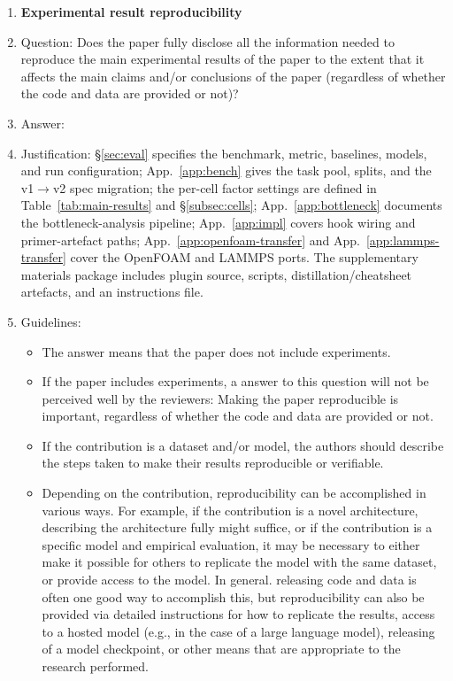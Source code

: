 \begin{enumerate}
    \item {\bf Experimental result reproducibility}
    \item[] Question: Does the paper fully disclose all the information needed to reproduce the main experimental results of the paper to the extent that it affects the main claims and/or conclusions of the paper (regardless of whether the code and data are provided or not)?
    \item[] Answer: \answerYes{}
    \item[] Justification: \S\ref{sec:eval} specifies the benchmark, metric, baselines, models, and run configuration; App.~\ref{app:bench} gives the task pool, splits, and the v1$\to$v2 spec migration; the per-cell factor settings are defined in Table~\ref{tab:main-results} and \S\ref{subsec:cells}; App.~\ref{app:bottleneck} documents the bottleneck-analysis pipeline; App.~\ref{app:impl} covers hook wiring and primer-artefact paths; App.~\ref{app:openfoam-transfer} and App.~\ref{app:lammps-transfer} cover the OpenFOAM and LAMMPS ports. The supplementary materials package includes plugin source, scripts, distillation/cheatsheet artefacts, and an instructions file.
    \item[] Guidelines:
    \begin{itemize}
        \item The answer \answerNA{} means that the paper does not include experiments.
        \item If the paper includes experiments, a \answerNo{} answer to this question will not be perceived well by the reviewers: Making the paper reproducible is important, regardless of whether the code and data are provided or not.
        \item If the contribution is a dataset and\slash or model, the authors should describe the steps taken to make their results reproducible or verifiable.
        \item Depending on the contribution, reproducibility can be accomplished in various ways. For example, if the contribution is a novel architecture, describing the architecture fully might suffice, or if the contribution is a specific model and empirical evaluation, it may be necessary to either make it possible for others to replicate the model with the same dataset, or provide access to the model. In general. releasing code and data is often one good way to accomplish this, but reproducibility can also be provided via detailed instructions for how to replicate the results, access to a hosted model (e.g., in the case of a large language model), releasing of a model checkpoint, or other means that are appropriate to the research performed.

\end{itemize}
\end{enumerate}
